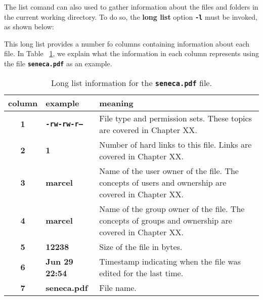 The list comand can also used to gather information about the files and folders in the current working directory. To do so, the \textbf{long list} option \textbf{\texttt{-l}} must be invoked, as shown below:
This long list provides a number fo columns containing information about each file. In Table~ \ref{tab:ch2_list}, we explain what the information in each column represents using the file \textbf{\texttt{seneca.pdf}} as an example.

\begin{table}[!htbp]
   \myfloatalign
   \begin{tabularx}{\textwidth}{cXp{70mm}} \toprule
   \textbf{column} & \textbf{example} & \textbf{meaning} \\ \bottomrule
   \textbf{1} & \textbf{\texttt{-rw-rw-r--}} & File type and permission sets. These topics are covered in Chapter XX.\\
   \textbf{2} & \textbf{1} & Number of hard links to this file. Links are covered in Chapter XX.\\
   \textbf{3} & \textbf{marcel} & Name of the user owner of the file. The concepts of users and ownership are covered in Chapter XX.\\
   \textbf{4} & \textbf{marcel} & Name of the group owner of the file. The concepts of groups and ownership are covered in Chapter XX.\\
   \textbf{5} & \textbf{12238} & Size of the file in bytes.\\
   \textbf{6} & \textbf{Jun 29 22:54} & Timestamp indicating when the file was edited for the last time.\\
   \textbf{7} & \textbf{seneca.pdf} & File name.\\
   \bottomrule
   \end{tabularx}
\caption{Long list information for the \textbf{\texttt{seneca.pdf}} file.}
\label{tab:ch2_list}
\end{table}

